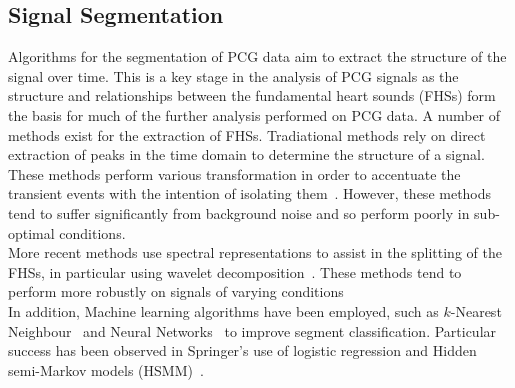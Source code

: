\documentclass[titlepage, 12pt]{scrartcl} \usepackage{enumitem}
\begin{document}
\subsection{Signal Segmentation}
Algorithms for the segmentation of PCG data aim to  extract the structure of
the signal over time. This is a key stage in the analysis of PCG signals as the
structure and relationships between the fundamental heart sounds (FHSs) form
the basis for much of the further analysis performed on PCG data. A number of
methods exist for the extraction of FHSs. Tradiational methods rely on direct
extraction of peaks in the time domain to determine the structure of a signal.
These methods perform various transformation in order to accentuate the
transient events with the intention of isolating them~\parencite{Liang1997b}.
However, these methods tend to suffer significantly from background noise and
so perform poorly in sub-optimal conditions.\\ More recent methods use spectral
representations to assist in the splitting of the FHSs, in particular using
wavelet decomposition~\parencite{Liang1997a, Vepa2008}. These methods tend to
perform more robustly on signals of varying conditions\\ In addition, Machine
learning algorithms have been employed, such as $k$-Nearest
Neighbour~\parencite{Gupta2007} and Neural Networks~\parencite{Oskiper2002} to
improve segment classification.  Particular success has been observed in
Springer's use of logistic regression and Hidden semi-Markov models
(HSMM)~\citeyearpar{Springer2016}.
\end{document}
